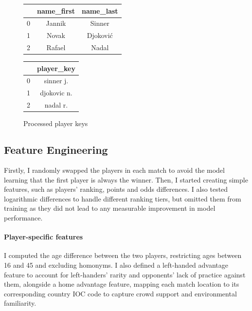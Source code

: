 \begin{figure}[ht]
    \centering
    \begin{minipage}{0.48\textwidth}
        \centering
        \caption{Original player names}
        \label{fig:original_players}
        \begin{tabular}{lcc}
            \hline
            & name\_first & name\_last \\
            \hline
            0 & Jannik & Sinner \\
            1 & Novak & Djoković \\
            2 & Rafael & Nadal \\
            \hline
        \end{tabular}
    \end{minipage}
    \hfill
    \begin{minipage}{0.48\textwidth}
        \centering
        \caption{Processed player keys}
        \label{fig:processed_players}
        \begin{tabular}{lc}
            \hline
            & player\_key \\
            \hline
            0 & sinner j. \\
            1 & djokovic n. \\
            2 & nadal r. \\
            \hline
        \end{tabular}
    \end{minipage}
\end{figure}

\subsection*{Feature Engineering}

Firstly, I randomly swapped the players in each match to avoid the model learning that the first player is always the winner.
Then, I started creating simple features, such as players' ranking, points and odds differences.
I also tested logarithmic differences to handle different ranking tiers, but omitted them from training as they did not lead to any measurable improvement in model performance.

\paragraph{Player-specific features} I computed the age difference between the two players, restricting ages between 16 and 45 and excluding homonyms. 
I also defined a left-handed advantage feature to account for left-handers' rarity and opponents' lack of practice against them, 
alongside a home advantage feature, mapping each match location to its corresponding country IOC code to capture crowd support and environmental familiarity.

